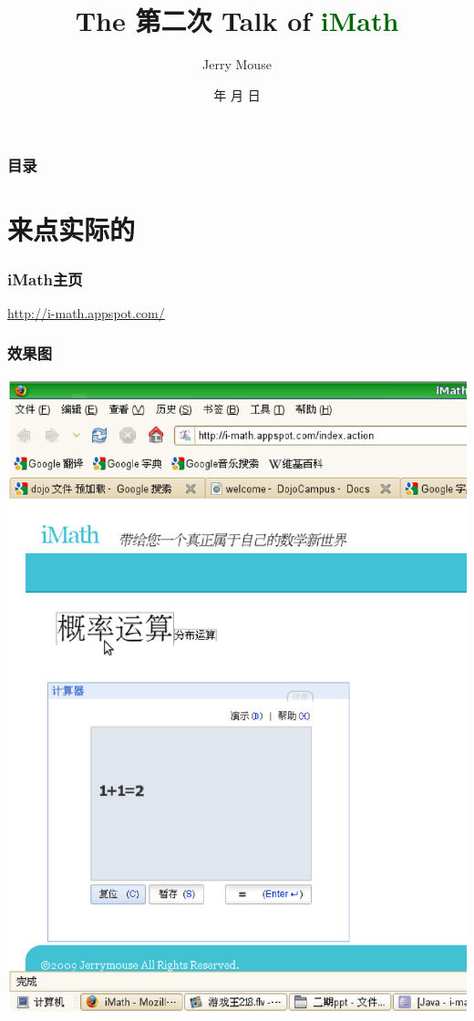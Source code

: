 \documentclass[dvipdfm,serif,mathserif]{beamer}
\renewcommand{\today}{\number\year 年 \number\month 月 \number\day 日}
\begin{document}
\title{The 第二次 Talk of \textcolor{darkgreen}{iMath}}
\date{\today}
\author{Jerry Mouse}

\begin{frame}
  \titlepage
\end{frame}
\begin{frame}\frametitle{目录}
\tableofcontents
\end{frame}



\section{来点实际的}


\begin{frame}
\frametitle{iMath主页}
 \href{http://i-math.appspot.com/}{http://i-math.appspot.com/}
\end{frame}

\begin{frame}
  \frametitle{效果图}
  \includegraphics[width=\textwidth]{screenshot.ps}
\end{frame}
\end{document}
